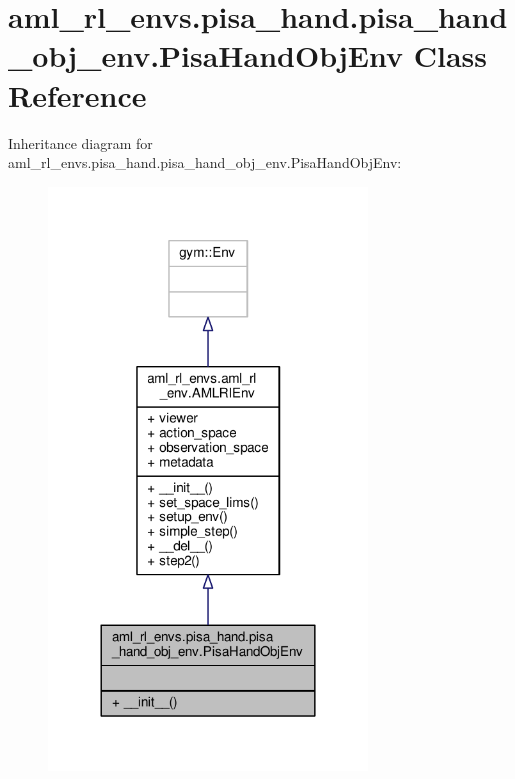 \hypertarget{classaml__rl__envs_1_1pisa__hand_1_1pisa__hand__obj__env_1_1_pisa_hand_obj_env}{\section{aml\-\_\-rl\-\_\-envs.\-pisa\-\_\-hand.\-pisa\-\_\-hand\-\_\-obj\-\_\-env.\-Pisa\-Hand\-Obj\-Env Class Reference}
\label{classaml__rl__envs_1_1pisa__hand_1_1pisa__hand__obj__env_1_1_pisa_hand_obj_env}
}


Inheritance diagram for aml\-\_\-rl\-\_\-envs.\-pisa\-\_\-hand.\-pisa\-\_\-hand\-\_\-obj\-\_\-env.\-Pisa\-Hand\-Obj\-Env\-:
\nopagebreak
\begin{figure}[H]
\begin{center}
\leavevmode
\includegraphics[width=240pt]{classaml__rl__envs_1_1pisa__hand_1_1pisa__hand__obj__env_1_1_pisa_hand_obj_env__inherit__graph}
\end{center}
\end{figure}


